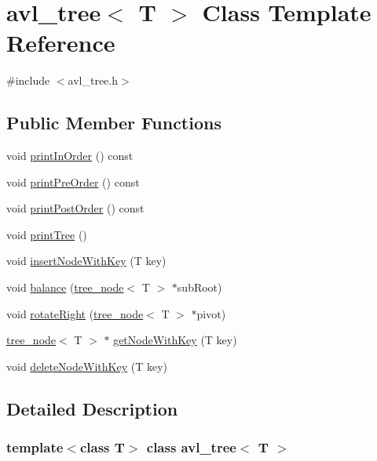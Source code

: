 \hypertarget{classavl__tree}{}\section{avl\+\_\+tree$<$ T $>$ Class Template Reference}
\label{classavl__tree}


{\ttfamily \#include $<$avl\+\_\+tree.\+h$>$}

\subsection*{Public Member Functions}
\begin{DoxyCompactItemize}
\item 
void \hyperlink{classavl__tree_a524ae6ac5d7f7c2399fb758aba84af80}{print\+In\+Order} () const
\item 
void \hyperlink{classavl__tree_ac17fa1e4aa2f0f4b609a7b72c34bd2f6}{print\+Pre\+Order} () const
\item 
void \hyperlink{classavl__tree_a5fb83061648947aeb6b540a5dee7ae13}{print\+Post\+Order} () const
\item 
void \hyperlink{classavl__tree_ae067ad48ed35e1df18fdda1ed83c3d79}{print\+Tree} ()
\item 
void \hyperlink{classavl__tree_afece250225096dba051bd467e89b3657}{insert\+Node\+With\+Key} (T key)
\item 
void \hyperlink{classavl__tree_a97854f2ab9e9e89b0dfc2e262a4bca0f}{balance} (\hyperlink{classtree__node}{tree\+\_\+node}$<$ T $>$ $\ast$sub\+Root)
\item 
void \hyperlink{classavl__tree_a924a12b6610a548c331e909b5a6d0855}{rotate\+Right} (\hyperlink{classtree__node}{tree\+\_\+node}$<$ T $>$ $\ast$pivot)
\item 
\hyperlink{classtree__node}{tree\+\_\+node}$<$ T $>$ $\ast$ \hyperlink{classavl__tree_acc15be343ae8c57859902e5e2b55c2a2}{get\+Node\+With\+Key} (T key)
\item 
void \hyperlink{classavl__tree_a2ed74e7f2e93edea90c5867ec127086f}{delete\+Node\+With\+Key} (T key)
\end{DoxyCompactItemize}


\subsection{Detailed Description}
\subsubsection*{template$<$class T$>$\newline
class avl\+\_\+tree$<$ T $>$}

